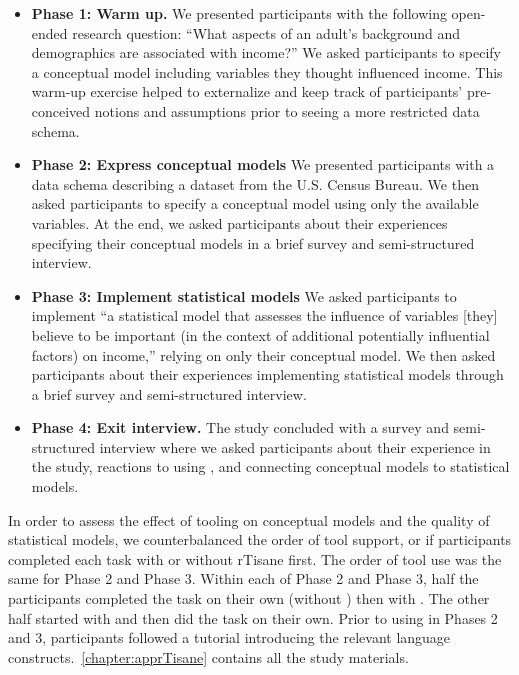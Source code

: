 \begin{itemize}
    \item \textbf{Phase 1: Warm up.} We presented participants with the
    following open-ended research question: ``What aspects of an adult's
    background and demographics are associated with income?'' We asked
    participants to specify a conceptual model including variables they thought
    influenced income. This warm-up exercise helped to externalize and keep
    track of participants' pre-conceived notions and assumptions prior to seeing
    a more restricted data schema.
    \item \textbf{Phase 2: Express conceptual models} We presented participants
    with a data schema describing a dataset from the U.S. Census Bureau. We then
    asked participants to specify a conceptual model using only the available
    variables. At the end, we asked participants about their
    experiences specifying their conceptual models in a brief survey and semi-structured interview.
    \item \textbf{Phase 3: Implement statistical models} We asked participants
    to implement ``a statistical model that assesses the influence of variables
    [they] believe to be important (in the context of additional potentially
    influential factors) on income,'' relying on only their conceptual model. We
    then asked participants about their experiences implementing statistical
    models through a brief survey and semi-structured interview. 
    \item \textbf{Phase 4: Exit interview.} The study concluded with a survey
    and semi-structured interview where we asked participants about their
    experience in the study, reactions to using \rTisane, and connecting
    conceptual models to statistical models.
\end{itemize} 

In order to assess the effect of tooling on conceptual models and the quality of
statistical models, we counterbalanced the order of tool support, or if
participants completed each task with or without rTisane first. The order of
tool use was the same for Phase 2 and Phase 3. Within each of Phase 2 and Phase 3,
half the participants completed the task on their own (without \rTisane) then
with \rTisane. The other half started with \rTisane and then did the task on
their own. Prior to using \rTisane in Phases 2 and 3, participants followed a
tutorial introducing the relevant language
constructs.~\autoref{chapter:apprTisane} contains all the study
materials.

